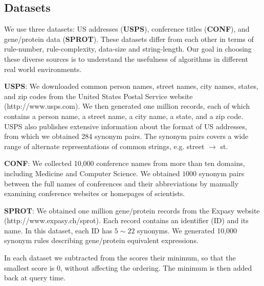 \documentclass{sig-alternate}
\begin{document}
\subsection{Datasets}
We use three datasets: US addresses (\textbf{USPS}),
conference titles  (\textbf{CONF}), and gene/protein data
(\textbf{SPROT}). These datasets differ from each other in terms of rule-number, rule-complexity, data-size and string-length. Our goal in choosing these diverse sources is to understand the usefulness of algorithms in different real world environments.

\smallskip
\noindent \textbf{{USPS}}: We downloaded common person names, street names,
city names, states, and zip codes from the United States Postal
Service website ({\footnotesize http://www.usps.com}). We then generated
one million records, each of which contains a person name, a street
name, a city name, a state, and a zip code. USPS also publishes
extensive information about the format of US addresses, from which we
obtained 284 synonym pairs. The synonym pairs covers a wide range of alternate
representations of common strings, e.g. street $\rightarrow$ st.


\noindent \textbf{{CONF}}: We collected 10,000 conference names
from more than ten domains, including Medicine and Computer
Science.
We obtained $1000$ synonym pairs between the full names of conferences and their
abbreviations by manually examining conference websites or homepages
of scientists.


\noindent \textbf{{SPROT}}: We obtained one million gene/protein records
from the Expasy website ({\footnotesize http://www.expasy.ch/sprot}).
Each record contains an identifier (ID) and its name.
In this dataset, each ID has $5\sim22$ synonyms. We generated 10,000 synonym rules describing gene/protein
equivalent expressions.

In each dataset we subtracted from the scores their minimum,
so that the smallest score is 0, without affecting the
ordering. The minimum is then added back at query time.
\end{document}
